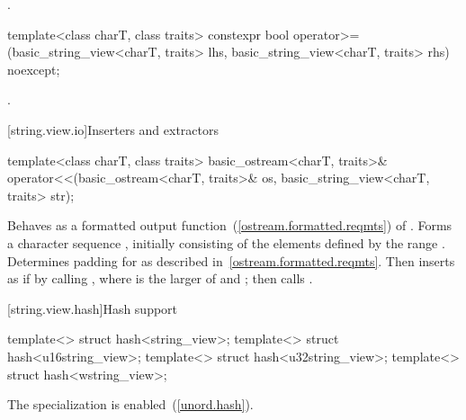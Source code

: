 \begin{itemdescr}
\pnum
\returns
{}.
\end{itemdescr}

%
\begin{itemdecl}
template<class charT, class traits>
  constexpr bool operator>=(basic_string_view<charT, traits> lhs,
                            basic_string_view<charT, traits> rhs) noexcept;
\end{itemdecl}

\begin{itemdescr}
\pnum
\returns
{}.
\end{itemdescr}

[string.view.io]{Inserters and extractors}

%
\begin{itemdecl}
template<class charT, class traits>
  basic_ostream<charT, traits>&
    operator<<(basic_ostream<charT, traits>& os,
               basic_string_view<charT, traits> str);
\end{itemdecl}

\begin{itemdescr}
\pnum
\effects
Behaves as a formatted output
function~(\ref{ostream.formatted.reqmts}) of . Forms a character sequence
, initially consisting of the elements defined by the range
. Determines padding for 
as described in~\ref{ostream.formatted.reqmts}.
Then inserts  as if by calling
, where  is the larger
of  and ;
then calls .

\pnum
\returns
{}
\end{itemdescr}

[string.view.hash]{Hash support}

%
%
%
%
\begin{itemdecl}
template<> struct hash<string_view>;
template<> struct hash<u16string_view>;
template<> struct hash<u32string_view>;
template<> struct hash<wstring_view>;
\end{itemdecl}

\begin{itemdescr}
\pnum
The specialization is enabled~(\ref{unord.hash}).
\end{itemdescr}


